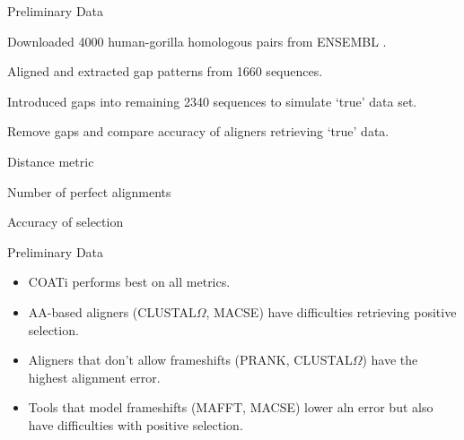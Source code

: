\documentclass{beamer}
\begin{document}


\begin{frame}{Preliminary Data} %
\begin{itemize}
	\item Downloaded 4000 human-gorilla homologous pairs from ENSEMBL
		\parencite{ensembl_hubbard_2002}.
	\item Aligned and extracted gap patterns from 1660 sequences.
	\item Introduced gaps into remaining 2340 sequences to simulate `true' data set.
	\item Remove gaps and compare accuracy of aligners retrieving `true' data.
	{\setlength\itemindent{15pt} \item[ ] Distance metric}
	{\setlength\itemindent{15pt} \item[ ] Number of perfect alignments}
	{\setlength\itemindent{15pt} \item[ ] Accuracy of selection}

\end{itemize}
\end{frame} %

\begin{frame}{Preliminary Data} %
\resizebox{1.03\linewidth}{!}{%
\hspace{-0.8em}\centering{}
}
\vspace{1em}
\begin{itemize}
	\item COATi performs best on all metrics.
	\item AA-based aligners (CLUSTAL$\Omega$, MACSE) have difficulties retrieving
		positive selection.
	\item Aligners that don't allow frameshifts (PRANK, CLUSTAL$\Omega$) have the
		highest alignment error.
	\item Tools that model frameshifts (MAFFT, MACSE) lower aln error but also
		have difficulties with positive selection.
\end{itemize}
\end{frame} %
\end{document}
